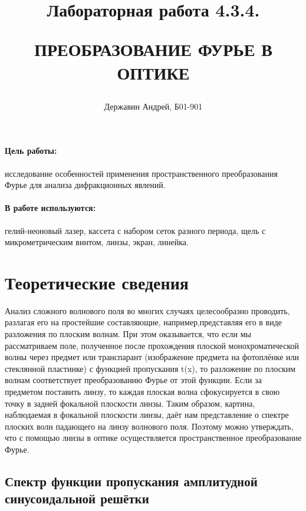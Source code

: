 \documentclass[a5paper,10pt, twoside]{article} %
\title
{
\hfill \break	\hfill \break
\hfill \break	\hfill \break
Лабораторная работа 4.3.4.

ПРЕОБРАЗОВАНИЕ ФУРЬЕ В ОПТИКЕ
}
\author{Державин Андрей, Б01-901}
\begin{document}
\maketitle


\thispagestyle{empty} %

\newpage

\tableofcontents %

\newpage


\paragraph{Цель работы:}

исследование особенностей применения пространственного преобразования Фурье
для анализа дифракционных явлений.


\paragraph{В работе используются:}

гелий-неоновый лазер, кассета с набором
сеток разного периода, щель с микрометрическим винтом, линзы,
экран, линейка.

\section{Теоретические сведения}

Анализ сложного волнового поля во многих случаях целесообразно проводить, разлагая его на 
простейшие составляющие, например,представляя его в виде разложения по плоским волнам. При этом 
оказывается, что если мы рассматриваем поле, полученное после прохождения плоской 
монохроматической волны через предмет или транспарант (изображение предмета на фотоплёнке или 
стеклянной пластинке) с функцией пропускания t(x), то разложение по плоским волнам соответствует 
преобразованию Фурье от этой функции. Если за предметом поставить линзу, то каждая плоская волна 
сфокусируется в свою точку в задней фокальной плоскости линзы. Таким образом, картина, наблюдаемая 
в фокальной плоскости линзы, даёт нам представление о спектре плоских волн падающего на линзу 
волнового поля. Поэтому можно утверждать, что с помощью линзы в оптике осуществляется 
пространственное преобразование Фурье.

\subsection{Спектр функции пропускания амплитудной синусоидальной решётки}
	
\end{document}
